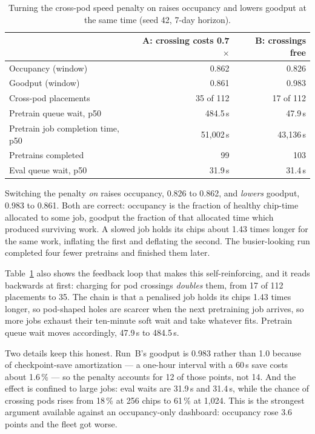\begin{table}[t]
\centering
\begin{tabular}{lrr}
\toprule
 & A: crossing costs 0.7$\times$ & B: crossings free \\
\midrule
Occupancy (window) & 0.862 & 0.826 \\
Goodput (window) & 0.861 & 0.983 \\
\midrule
Cross-pod placements & 35 of 112 & 17 of 112 \\
Pretrain queue wait, p50 & 484.5\,s & 47.9\,s \\
Pretrain job completion time, p50 & 51{,}002\,s & 43{,}136\,s \\
Pretrains completed & 99 & 103 \\
Eval queue wait, p50 & 31.9\,s & 31.4\,s \\
\bottomrule
\end{tabular}
\caption{Turning the cross-pod speed penalty on raises occupancy and lowers
goodput at the same time (seed 42, 7-day horizon).}
\label{tab:penalty}
\end{table}

Switching the penalty \emph{on} raises occupancy, 0.826 to 0.862, and
\emph{lowers} goodput, 0.983 to 0.861. Both are correct: occupancy is the
fraction of healthy chip-time allocated to some job, goodput the fraction of
that allocated time which produced surviving work. A slowed job holds its
chips about 1.43 times longer for the same work, inflating the first and
deflating the second. The busier-looking run completed four fewer pretrains
and finished them later.

Table~\ref{tab:penalty} also shows the feedback loop that makes this
self-reinforcing, and it reads backwards at first: charging for pod crossings
\emph{doubles} them, from 17 of 112 placements to 35. The chain is that a
penalised job holds its chips 1.43 times longer, so pod-shaped holes are
scarcer when the next pretraining job arrives, so more jobs exhaust their
ten-minute soft wait and take whatever fits. Pretrain queue wait moves
accordingly, 47.9\,s to 484.5\,s.

Two details keep this honest. Run~B's goodput is 0.983 rather than 1.0 because
of checkpoint-save amortization --- a one-hour interval with a 60\,s save
costs about 1.6\,\% --- so the penalty accounts for 12 of those points, not
14. And the effect is confined to large jobs: eval waits are 31.9\,s and
31.4\,s, while the chance of crossing pods rises from 18\,\% at 256 chips to
61\,\% at 1,024. This is the strongest argument available against an
occupancy-only dashboard: occupancy rose 3.6 points and the fleet got worse.

